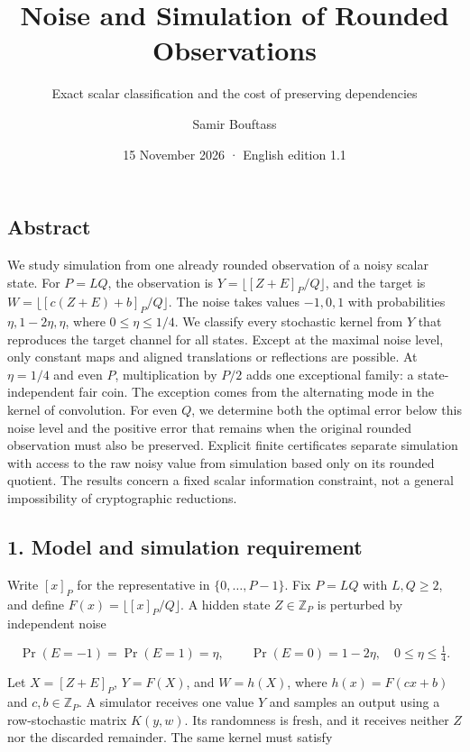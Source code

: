 \documentclass[
]{article}
\title{Noise and Simulation of Rounded Observations}
\subtitle{Exact scalar classification and the cost of preserving
dependencies}
\author{Samir Bouftass}
\date{15 November 2026 · English edition 1.1}
\begin{document}
\maketitle

\subsection{Abstract}\label{abstract}

We study simulation from one already rounded observation of a noisy
scalar state. For \(P=LQ\), the observation is
\(Y=\lfloor[Z+E]_P/Q\rfloor\), and the target is
\(W=\lfloor[c(Z+E)+b]_P/Q\rfloor\). The noise takes values \(-1,0,1\)
with probabilities \(\eta,1-2\eta,\eta\), where \(0\le\eta\le1/4\). We
classify every stochastic kernel from \(Y\) that reproduces the target
channel for all states. Except at the maximal noise level, only constant
maps and aligned translations or reflections are possible. At
\(\eta=1/4\) and even \(P\), multiplication by \(P/2\) adds one
exceptional family: a state-independent fair coin. The exception comes
from the alternating mode in the kernel of convolution. For even \(Q\),
we determine both the optimal error below this noise level and the
positive error that remains when the original rounded observation must
also be preserved. Explicit finite certificates separate simulation with
access to the raw noisy value from simulation based only on its rounded
quotient. The results concern a fixed scalar information constraint, not
a general impossibility of cryptographic reductions.

\subsection{1. Model and simulation
requirement}\label{model-and-simulation-requirement}

Write \([x]_P\) for the representative in \(\{0,\ldots,P-1\}\). Fix
\(P=LQ\) with \(L,Q\ge2\), and define \(F(x)=\lfloor[x]_P/Q\rfloor\). A
hidden state \(Z\in\mathbb Z_P\) is perturbed by independent noise

\[
\Pr(E=-1)=\Pr(E=1)=\eta,\qquad \Pr(E=0)=1-2\eta,
\quad 0\le\eta\le\tfrac14.
\tag{1}
\]

Let \(X=[Z+E]_P\), \(Y=F(X)\), and \(W=h(X)\), where \(h(x)=F(cx+b)\)
and \(c,b\in\mathbb Z_P\). A simulator receives one value \(Y\) and
samples an output using a row-stochastic matrix \(K(y,w)\). Its
randomness is fresh, and it receives neither \(Z\) nor the discarded
remainder. The same kernel must satisfy
\end{document}
